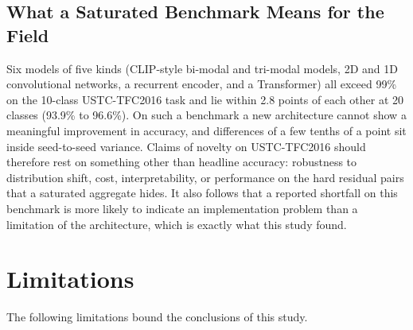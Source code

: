 \documentclass[journal]{IEEEtran}
\begin{document}
\subsection{What a Saturated Benchmark Means for the Field}
Six models of five kinds (CLIP-style bi-modal and tri-modal models, 2D and 1D convolutional networks, a recurrent encoder, and a Transformer) all exceed 99\% on the 10-class USTC-TFC2016 task and lie within 2.8 points of each other at 20 classes (93.9\% to 96.6\%). On such a benchmark a new architecture cannot show a meaningful improvement in accuracy, and differences of a few tenths of a point sit inside seed-to-seed variance. Claims of novelty on USTC-TFC2016 should therefore rest on something other than headline accuracy: robustness to distribution shift, cost, interpretability, or performance on the hard residual pairs that a saturated aggregate hides. It also follows that a reported shortfall on this benchmark is more likely to indicate an implementation problem than a limitation of the architecture, which is exactly what this study found.

\section{Limitations}\label{sec:limitations}

The following limitations bound the conclusions of this study.
\end{document}
